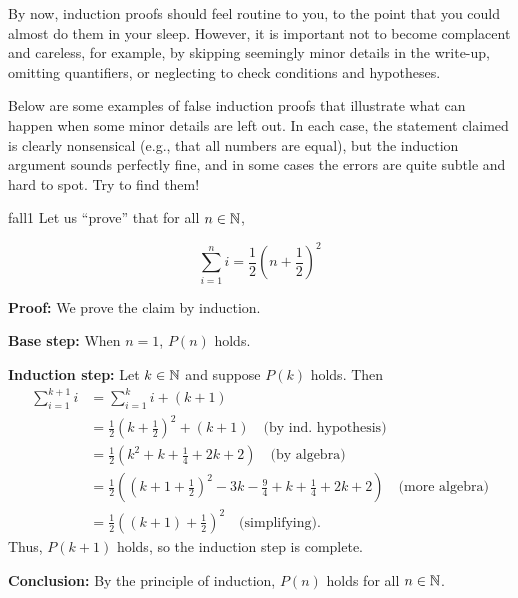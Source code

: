 By now, induction proofs should feel routine to you, to the point that you
could almost do them in your sleep.  However, it is important not to become
complacent and careless, for example, by skipping seemingly minor details in
the write-up, omitting quantifiers, or neglecting to check conditions and
hypotheses. 

Below are some examples of false induction proofs that illustrate what can
happen when some minor details are left out.  In each case, the statement 
claimed is clearly nonsensical (e.g., that all numbers are equal), but the
induction argument sounds perfectly fine, and in some cases the errors are quite
subtle and hard to spot. Try to find them!

\begin{example}{fall1} Let us ``prove'' that for all $n\in\mathbb{N}$,  

\[
\tag{$P(n)$} \sum_{i=1}^n i=\frac12(n+\frac12)^2
\]

\textbf{Proof:} We prove the claim by induction. 

\textbf{Base step:} When $n=1$, $P(n)$ holds.

\textbf{Induction step:} 
Let $k\in\mathbb{N}$ and 
suppose $P(k)$ holds. Then
\begin{align*}
\sum_{i=1}^{k+1} i &=\sum_{i=1}^k i + (k+1)
\\
&=\frac12\left(k+\frac12\right)^2+ (k+1)
\quad\text{(by ind. hypothesis)}
\\
&=\frac12\left(k^2+k+\frac14+2k+2\right)
\quad\text{(by algebra)}
\\
&=\frac12\left(\left(k+1+\frac12\right)^2-3k-\frac94 +k+\frac14+2k+2\right)
\quad\text{(more algebra)}
\\
&=\frac12\left((k+1)+\frac12\right)^2
\quad\text{(simplifying).}
\end{align*}
Thus, $P(k+1)$ holds,  so the induction
step is complete.

\textbf{Conclusion:} By the principle of induction, $P(n)$ holds for all
$n\in\mathbb{N}$.
\end{example}

%



